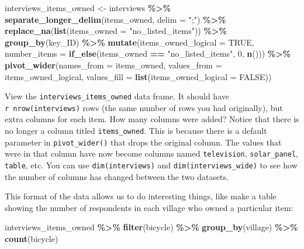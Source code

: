 \documentclass[
]{article}
\newenvironment{Shaded}{\begin{snugshade}}{\end{snugshade}}
\newcommand{\AttributeTok}[1]{\textcolor[rgb]{0.13,0.29,0.53}{#1}}
\newcommand{\ConstantTok}[1]{\textcolor[rgb]{0.56,0.35,0.01}{#1}}
\newcommand{\DecValTok}[1]{\textcolor[rgb]{0.00,0.00,0.81}{#1}}
\newcommand{\FunctionTok}[1]{\textcolor[rgb]{0.13,0.29,0.53}{\textbf{#1}}}
\newcommand{\NormalTok}[1]{#1}
\newcommand{\OtherTok}[1]{\textcolor[rgb]{0.56,0.35,0.01}{#1}}
\newcommand{\SpecialCharTok}[1]{\textcolor[rgb]{0.81,0.36,0.00}{\textbf{#1}}}
\newcommand{\StringTok}[1]{\textcolor[rgb]{0.31,0.60,0.02}{#1}}
\begin{document}
\begin{Shaded}
\begin{Highlighting}[]
\NormalTok{interviews\_items\_owned }\OtherTok{\textless{}{-}}\NormalTok{ interviews }\SpecialCharTok{\%\textgreater{}\%}
  \FunctionTok{separate\_longer\_delim}\NormalTok{(items\_owned, }\AttributeTok{delim =} \StringTok{";"}\NormalTok{) }\SpecialCharTok{\%\textgreater{}\%}
  \FunctionTok{replace\_na}\NormalTok{(}\FunctionTok{list}\NormalTok{(}\AttributeTok{items\_owned =} \StringTok{"no\_listed\_items"}\NormalTok{)) }\SpecialCharTok{\%\textgreater{}\%}
  \FunctionTok{group\_by}\NormalTok{(key\_ID) }\SpecialCharTok{\%\textgreater{}\%}
  \FunctionTok{mutate}\NormalTok{(}\AttributeTok{items\_owned\_logical =} \ConstantTok{TRUE}\NormalTok{,}
         \AttributeTok{number\_items =} \FunctionTok{if\_else}\NormalTok{(items\_owned }\SpecialCharTok{==} \StringTok{"no\_listed\_items"}\NormalTok{, }\DecValTok{0}\NormalTok{, }\FunctionTok{n}\NormalTok{())) }\SpecialCharTok{\%\textgreater{}\%}
  \FunctionTok{pivot\_wider}\NormalTok{(}\AttributeTok{names\_from =}\NormalTok{ items\_owned,}
              \AttributeTok{values\_from =}\NormalTok{ items\_owned\_logical,}
              \AttributeTok{values\_fill =} \FunctionTok{list}\NormalTok{(}\AttributeTok{items\_owned\_logical =} \ConstantTok{FALSE}\NormalTok{))}
\end{Highlighting}
\end{Shaded}

View the \texttt{interviews\_items\_owned} data frame. It should have
\texttt{r\ nrow(interviews)} rows (the same number of rows you had
originally), but extra columns for each item. How many columns were
added? Notice that there is no longer a column titled
\texttt{items\_owned}. This is because there is a default parameter in
\texttt{pivot\_wider()} that drops the original column. The values that
were in that column have now become columns named \texttt{television},
\texttt{solar\_panel}, \texttt{table}, etc. You can use
\texttt{dim(interviews)} and \texttt{dim(interviews\_wide)} to see how
the number of columns has changed between the two datasets.

This format of the data allows us to do interesting things, like make a
table showing the number of respondents in each village who owned a
particular item:

\begin{Shaded}
\begin{Highlighting}[]
\NormalTok{interviews\_items\_owned }\SpecialCharTok{\%\textgreater{}\%}
  \FunctionTok{filter}\NormalTok{(bicycle) }\SpecialCharTok{\%\textgreater{}\%}
  \FunctionTok{group\_by}\NormalTok{(village) }\SpecialCharTok{\%\textgreater{}\%}
  \FunctionTok{count}\NormalTok{(bicycle)}
\end{Highlighting}
\end{Shaded}
\end{document}
